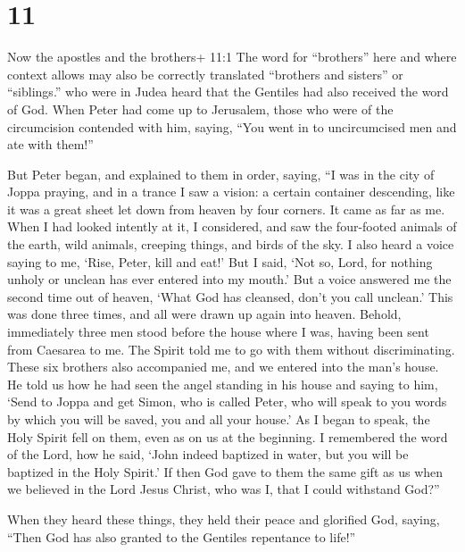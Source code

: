 \hypertarget{section-10}{%
\section{11}\label{section-10}}

 Now the apostles and the brothers+ 11:1 The word for
``brothers'' here and where context allows may also be correctly
translated ``brothers and sisters'' or ``siblings.'' who were in Judea
heard that the Gentiles had also received the word of God. 
When Peter had come up to Jerusalem, those who were of the circumcision
contended with him,  saying, ``You went in to uncircumcised
men and ate with them!''

 But Peter began, and explained to them in order, saying,
 ``I was in the city of Joppa praying, and in a trance I saw
a vision: a certain container descending, like it was a great sheet let
down from heaven by four corners. It came as far as me. 
When I had looked intently at it, I considered, and saw the four-footed
animals of the earth, wild animals, creeping things, and birds of the
sky.  I also heard a voice saying to me, `Rise, Peter, kill
and eat!'  But I said, `Not so, Lord, for nothing unholy or
unclean has ever entered into my mouth.'  But a voice
answered me the second time out of heaven, `What God has cleansed, don't
you call unclean.'  This was done three times, and all were
drawn up again into heaven.  Behold, immediately three men
stood before the house where I was, having been sent from Caesarea to
me.  The Spirit told me to go with them without
discriminating. These six brothers also accompanied me, and we entered
into the man's house.  He told us how he had seen the angel
standing in his house and saying to him, `Send to Joppa and get Simon,
who is called Peter,  who will speak to you words by which
you will be saved, you and all your house.'  As I began to
speak, the Holy Spirit fell on them, even as on us at the beginning.
 I remembered the word of the Lord, how he said, `John
indeed baptized in water, but you will be baptized in the Holy Spirit.'
 If then God gave to them the same gift as us when we
believed in the Lord Jesus Christ, who was I, that I could withstand
God?''

 When they heard these things, they held their peace and
glorified God, saying, ``Then God has also granted to the Gentiles
repentance to life!''

